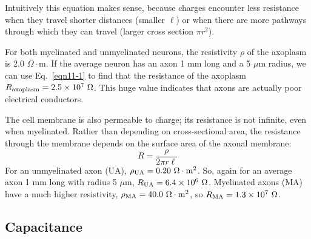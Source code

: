 Intuitively this equation makes sense, because charges encounter less resistance when they travel shorter distances (smaller $\ell$) or when there are more pathways through which they can travel (larger cross section $\pi r^2$).

For both myelinated and unmyelinated neurons, the resistivity $\rho$ of the axoplasm is 2.0 $\Omega\cdot$m.  If the average neuron has an axon 1 mm long and a 5 $\mu$m radius, we can use Eq.~\ref{eqn11-1} to find that the resistance of the axoplasm $R_{\rm axoplasm} = 2.5\times10^7~\Omega$.  This huge value indicates that axons are actually poor electrical conductors.

The cell membrane is also permeable to charge; its resistance is not infinite, even when myelinated.  Rather than depending on cross-sectional area, the resistance through the membrane depends on the surface area of the axonal membrane:
\begin{equation}\label{eqn11-2}
R=\frac{\rho}{2\pi r\ell}
\end{equation}
For an unmyelinated axon (UA), $\rho_{\rm UA} = 0.20~\Omega\cdot {\rm m}^2$.  So, again for an average axon 1 mm long with radius 5 $\mu$m, $R_{\rm UA} = 6.4\times10^6~\Omega$.  Myelinated axons (MA) have a much higher resistivity, $\rho_{\rm MA} = 40.0~\Omega\cdot {\rm m}^2$, so $R_{\rm MA} = 1.3\times10^7~\Omega$.

\subsection{Capacitance}

